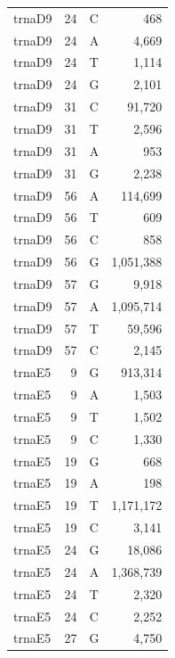 \documentclass[12pt]{rockefeller}
\begin{document}
\begin{tiny}
\begin{longtable}{|l|r|c|r|}
  trnaD9 &        24 &          C &        468 \\
  trnaD9 &        24 &          A &      4,669 \\
  trnaD9 &        24 &          T &      1,114 \\
  trnaD9 &        24 &          G &      2,101 \\
  trnaD9 &        31 &          C &     91,720 \\
  trnaD9 &        31 &          T &      2,596 \\
  trnaD9 &        31 &          A &        953 \\
  trnaD9 &        31 &          G &      2,238 \\
  trnaD9 &        56 &          A &    114,699 \\
  trnaD9 &        56 &          T &        609 \\
  trnaD9 &        56 &          C &        858 \\
  trnaD9 &        56 &          G &  1,051,388 \\
  trnaD9 &        57 &          G &      9,918 \\
  trnaD9 &        57 &          A &  1,095,714 \\
  trnaD9 &        57 &          T &     59,596 \\
  trnaD9 &        57 &          C &      2,145 \\
  trnaE5 &         9 &          G &    913,314 \\
  trnaE5 &         9 &          A &      1,503 \\
  trnaE5 &         9 &          T &      1,502 \\
  trnaE5 &         9 &          C &      1,330 \\
  trnaE5 &        19 &          G &        668 \\
  trnaE5 &        19 &          A &        198 \\
  trnaE5 &        19 &          T &  1,171,172 \\
  trnaE5 &        19 &          C &      3,141 \\
  trnaE5 &        24 &          G &     18,086 \\
  trnaE5 &        24 &          A &  1,368,739 \\
  trnaE5 &        24 &          T &      2,320 \\
  trnaE5 &        24 &          C &      2,252 \\
  trnaE5 &        27 &          G &      4,750 \\

\end{longtable}
\end{tiny}
\end{document}
